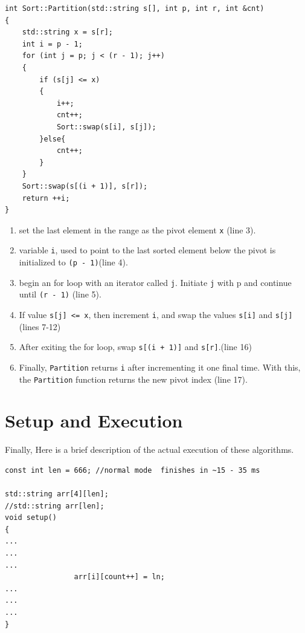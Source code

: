 \documentclass[letterpaper, 10pt]{article}
\begin{document}
 \begin{addmargin}[-5em]{1em}
\begin{small}
\begin{verbatim}
int Sort::Partition(std::string s[], int p, int r, int &cnt)
{
	std::string x = s[r];
	int i = p - 1;
	for (int j = p; j < (r - 1); j++)
	{
		if (s[j] <= x)
		{
			i++;
			cnt++;
			Sort::swap(s[i], s[j]);
		}else{
			cnt++;
		}
	}
	Sort::swap(s[(i + 1)], s[r]);
	return ++i;
}

\end{verbatim}
\end{small}
\end{addmargin}

\begin{enumerate}
    \item set the last element in the range as the pivot element \texttt{x} (line 3).
    \item variable \texttt{i}, used to point to the last sorted element below the pivot is initialized to \texttt{(p - 1)}(line 4).
    \item begin an for loop with an iterator called \texttt{j}. Initiate \texttt{j} with p and continue until \texttt{(r - 1)} (line 5).
    \item If value \texttt{s[j] <= x}, then increment \texttt{i},  and swap the values \texttt{s[i]} and \texttt{s[j]} (lines 7-12)
    \item After exiting the for loop, swap \texttt{s[(i + 1)]} and \texttt{s[r]}.(line 16)
    \item Finally, \texttt{Partition} returns \texttt{i} after incrementing it one final time. With this, the \texttt{Partition} function returns the new pivot index (line 17).
    \end{enumerate}







\section{Setup and Execution}

Finally, Here is a brief description of the actual execution of these algorithms. 
 \begin{addmargin}[-5em]{1em}
\begin{small}
\begin{verbatim}
const int len = 666; //normal mode  finishes in ~15 - 35 ms

std::string arr[4][len];
//std::string arr[len];
void setup()
{
...
...
...
				arr[i][count++] = ln;
...
...
...
}
\end{verbatim}
\end{small}
\end{addmargin}
\end{document}
